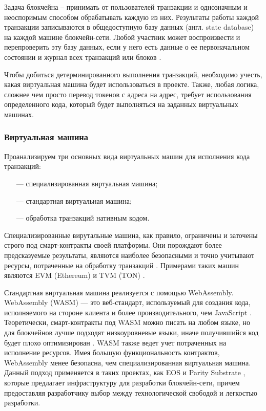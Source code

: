 Задача блокчейна -- принимать от пользователей транзакции и однозначным и неоспоримым способом обрабатывать каждую из них. Результаты работы каждой транзакции записываются в общедоступную базу данных (англ. state database) на каждой машине блокчейн-сети. Любой участник может воспроизвести и перепроверить эту базу данных, если у него есть данные о ее первоначальном состоянии и журнал всех транзакций или блоков \cite{ru-bchain4}. 

Чтобы добиться детерминированного выполнения транзакций, необходимо учесть, какая виртуальная машина будет использоваться в проекте. Также, любая логика, сложнее чем просто перевод токенов с адреса на адрес, требует использования определенного кода, который будет выполняться на заданных виртуальных машинах.

\subsubsection{Виртуальная машина}

Проанализируем три основных вида виртуальных машин для исполнения кода транзакций:
\begin{itemize}[leftmargin=1.6\parindent]
	\item[---] специализированная виртуальная машина;
	\item[---] стандартная виртуальная машина;
	\item[---] обработка транзакций нативным кодом.
\end{itemize}

Специализированные вирутальные машина, как правило, ограничены и заточены строго под смарт-контракты своей платформы. Они порождают более предсказуемые результаты, являются наиболее безопасными и точно учитывают ресурсы, потраченные на обработку транзакций \cite{blockchain}. Примерами таких машин являются EVM (Ethereum) \cite{evm} и TVM (TON) \cite{tvm}. 


Стандартная виртуальная машина реализуется с помощью WebAssembly. WebAssembly (WASM) — это веб-стандарт, используемый для создания кода, исполняемого на стороне клиента и более производительного, чем JavaScript \cite{wasm}. Теоретически, смарт-контракты под WASM можно писать на любом языке, но для блокчейнов лучше подходят низкоуровневые языки, иначе получившийся код будет плохо оптимизирован \cite{lowlevel}. WASM также ведет учет потраченных на исполнение ресурсов. Имея большую функциональность контрактов, WebAssembly менее безопасна, чем специализированная виртуальная машина. Данный подход применяется в таких проектах, как EOS \cite{eos} и Parity Substrate \cite{substrate}, которые предлагает инфраструктуру для разработки блокчейн-сети, причем предоставляя разработчику выбор между технологической свободой и легкостью разработки.


